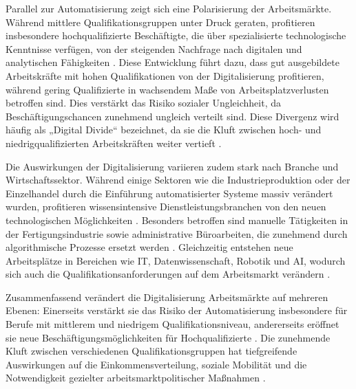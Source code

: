 Parallel zur Automatisierung zeigt sich eine Polarisierung der Arbeitsmärkte. Während mittlere
Qualifikationsgruppen unter Druck geraten, profitieren insbesondere hochqualifizierte
Beschäftigte, die über spezialisierte technologische Kenntnisse verfügen, von der
steigenden Nachfrage nach digitalen und analytischen Fähigkeiten 
\parencite[vgl.][S. 2510]{goos2014explaining}.
Diese Entwicklung führt dazu, dass gut ausgebildete Arbeitskräfte mit hohen Qualifikationen
von der Digitalisierung profitieren, während gering Qualifizierte in wachsendem Maße von
Arbeitsplatzverlusten betroffen sind. Dies verstärkt das Risiko sozialer Ungleichheit, da
Beschäftigungschancen zunehmend ungleich verteilt sind. Diese Divergenz wird häufig als
„Digital Divide“ bezeichnet, da sie die Kluft zwischen hoch- und niedrigqualifizierten
Arbeitskräften weiter vertieft \parencite[vgl.][S. 10]{acemoglu2002technical}.

Die Auswirkungen der Digitalisierung variieren zudem stark nach Branche und
Wirtschaftssektor. Während einige Sektoren wie die Industrieproduktion oder der
Einzelhandel durch die Einführung automatisierter Systeme massiv verändert wurden,
profitieren wissensintensive Dienstleistungsbranchen von den neuen technologischen Möglichkeiten
\parencite[vgl.][S. 1555]{autor2013thegrowth}. Besonders betroffen sind manuelle Tätigkeiten
in der Fertigungsindustrie sowie administrative Büroarbeiten, die zunehmend durch
algorithmische Prozesse ersetzt werden \parencite[vgl.][S. 260]{frey2013thefuture}.
Gleichzeitig entstehen neue Arbeitsplätze in Bereichen wie IT, Datenwissenschaft, Robotik
und \ac{AI}, wodurch sich auch die Qualifikationsanforderungen auf dem Arbeitsmarkt
verändern \parencite[vgl.][S. 2510]{goos2014explaining}.

Zusammenfassend verändert die Digitalisierung Arbeitsmärkte auf mehreren Ebenen: Einerseits
verstärkt sie das Risiko der Automatisierung insbesondere für Berufe mit mittlerem und niedrigem
Qualifikationsniveau, andererseits eröffnet sie neue Beschäftigungsmöglichkeiten für
Hochqualifizierte \parencite[vgl.][S. 1555]{autor2013thegrowth}. Die zunehmende Kluft zwischen
verschiedenen Qualifikationsgruppen hat tiefgreifende Auswirkungen auf die
Einkommensverteilung, soziale Mobilität und die Notwendigkeit gezielter
arbeitsmarktpolitischer Maßnahmen \parencite[S. 2510]{goos2014explaining}.


